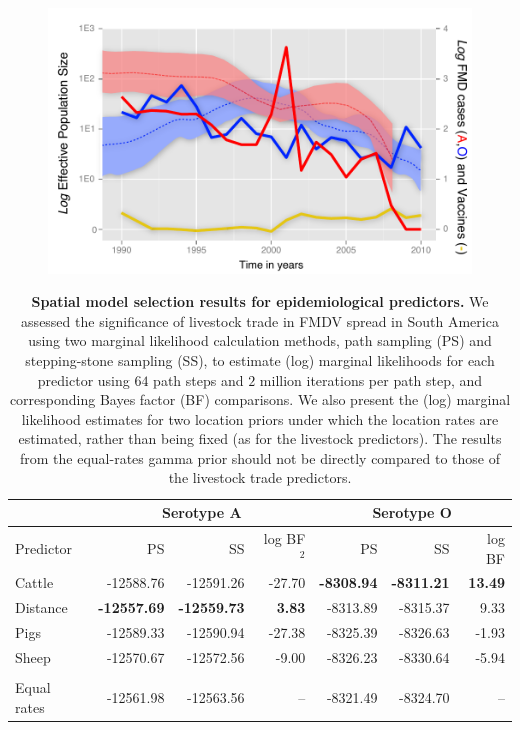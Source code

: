 \documentclass[10pt]{article}
\begin{document}
\newpage
\begin{figure}[H]
\begin{center}
\includegraphics[scale=1.0]{FIGURES/skyride.pdf}
\end{center}
\caption{}
\label{fig:skyride}
\end{figure}
\newpage
\begin{table}[H]
\caption{
\textbf{Spatial model selection results for epidemiological predictors.}
We assessed the significance of livestock trade in FMDV spread in South America using two marginal likelihood calculation methods, path sampling (PS) and stepping-stone sampling (SS), to estimate (log) marginal likelihoods for each predictor using $64$ path steps and $2$ million iterations per path step, and corresponding Bayes factor (BF) comparisons.
We also present the (log) marginal likelihood estimates for two location priors under which the location rates are estimated, rather than being fixed (as for the livestock predictors).
The results from the equal-rates gamma prior should not be directly compared to those of the livestock trade predictors.
}
\begin{center}
\begin{tabular}{lrrrrrr}
\toprule
 & \multicolumn{3}{c}{Serotype A}& \multicolumn{3}{c}{Serotype O}\\
 \midrule
Predictor & PS & SS & log BF$^2$ & PS & SS & log BF \\
Cattle&-12588.76&-12591.26&-27.70&\textbf{-8308.94}&\textbf{-8311.21}& \textbf{13.49}\\
Distance&\textbf{-12557.69}&\textbf{-12559.73}&\textbf{3.83}&-8313.89&-8315.37&9.33\\
Pigs&-12589.33&-12590.94&-27.38&-8325.39&-8326.63&-1.93\\
Sheep&-12570.67&-12572.56&-9.00&-8326.23&-8330.64&-5.94\\
\\
\hline
Equal rates &-12561.98&-12563.56&--&-8321.49&-8324.70&--\\
\bottomrule
\end{tabular}
\end{center}
\begin{flushleft}
\end{flushleft}
\label{tab:preds}
 \end{table}
\end{document}
